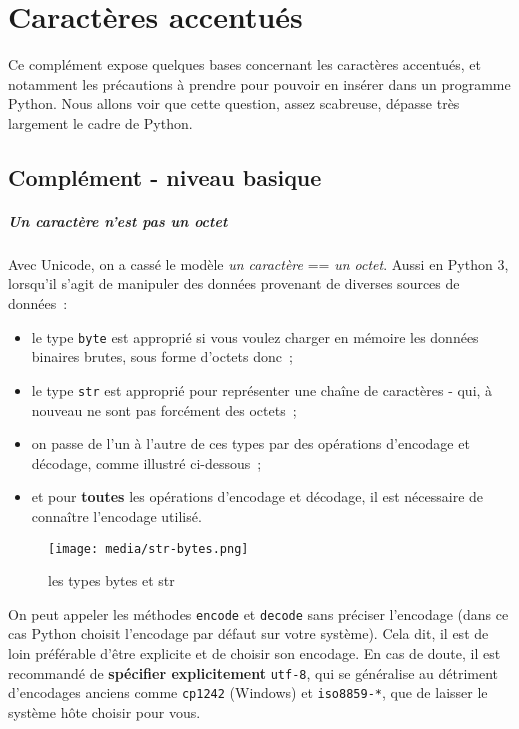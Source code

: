     
    
    
    

    

    \hypertarget{caractuxe8res-accentuuxe9s}{%
\section{Caractères accentués}\label{caractuxe8res-accentuuxe9s}}

    Ce complément expose quelques bases concernant les caractères accentués,
et notamment les précautions à prendre pour pouvoir en insérer dans un
programme Python. Nous allons voir que cette question, assez scabreuse,
dépasse très largement le cadre de Python.

    \hypertarget{compluxe9ment---niveau-basique}{%
\subsection{Complément - niveau
basique}\label{compluxe9ment---niveau-basique}}

    \hypertarget{un-caractuxe8re-nest-pas-un-octet}{%
\subparagraph{Un caractère n'est pas un
octet}\label{un-caractuxe8re-nest-pas-un-octet}}

    Avec Unicode, on a cassé le modèle \emph{un caractère} == \emph{un
octet}. Aussi en Python 3, lorsqu'il s'agit de manipuler des données
provenant de diverses sources de données~:

\begin{itemize}
\tightlist
\item
  le type \texttt{byte} est approprié si vous voulez charger en mémoire
  les données binaires brutes, sous forme d'octets donc~;
\item
  le type \texttt{str} est approprié pour représenter une chaîne de
  caractères - qui, à nouveau ne sont pas forcément des octets~;
\item
  on passe de l'un à l'autre de ces types par des opérations d'encodage
  et décodage, comme illustré ci-dessous~;
\item
  et pour \textbf{toutes} les opérations d'encodage et décodage, il est
  nécessaire de connaître l'encodage utilisé.
\end{itemize}

    \begin{figure}
\centering
\texttt{[image: media/str-bytes.png]}
\caption{les types bytes et str}
\end{figure}

    On peut appeler les méthodes \texttt{encode} et \texttt{decode} sans
préciser l'encodage (dans ce cas Python choisit l'encodage par défaut
sur votre système). Cela dit, il est de loin préférable d'être explicite
et de choisir son encodage. En cas de doute, il est recommandé de
\textbf{spécifier explicitement} \texttt{utf-8}, qui se généralise au
détriment d'encodages anciens comme \texttt{cp1242} (Windows) et
\texttt{iso8859-*}, que de laisser le système hôte choisir pour vous.

